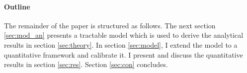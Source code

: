 \paragraph{Outline}
The remainder of the paper is structured as follows. The next section \ref{sec:mod_an} presents a tractable model which is used to derive the analytical results in section \ref{sec:theory}. In section \ref{sec:model}, I extend the model to a quantitative framework and calibrate it. I present and discuss the quantitative results in section \ref{sec:res}. Section \ref{sec:con} concludes.